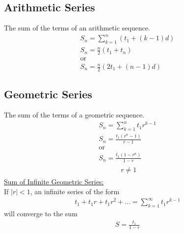 \documentclass[10pt, a4paper, titlepage]{article}
\begin{document}
\begin{multicols*}{3}
\subsection{Arithmetic Series}
The sum of the terms of an arithmetic sequence.
\begin{gather}
	S_n=\sum_{k=1}^n\left(t_1+(k-1)d\right)\\
	S_n=\frac{n}{2}(t_1+t_n)\\
	\text{or}\\
	S_n=\frac{n}{2}(2t_1+(n-1)d)
\end{gather}
\dotfill
\subsection{Geometric Series}
The sum of the terms of a geometric sequence.
\begin{gather}
	S_n=\sum_{k=1}^nt_1r^{k-1}\\
	S_n=\frac{t_1(r^n-1)}{r-1}\\
	\text{or}\\
	S_n=\frac{t_1(1-r^n)}{1-r}\\
	\begin{flalign}
		&\qquad r\neq 1&&
	\end{flalign}
\end{gather}
\underline{Sum of Infinite Geometric Series:}\\
If $|r|<1$, an infinite series of the form
\begin{align}
	t_1+t_1r+t_1r^2+\dots =\sum_{k=1}^\infty t_1r^{k-1}
\end{align}
will converge to the sum
\begin{align}
	S=\frac{t_1}{1-r}
\end{align}
\hrulefill
\end{multicols*}
\end{document}
